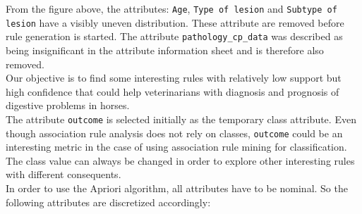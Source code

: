 From the figure above, the attributes: \verb|Age|, \verb|Type of lesion| and \verb|Subtype of lesion| have a visibly uneven distribution. These attribute are removed before rule generation is started. The attribute \verb|pathology_cp_data| was described as being insignificant in the attribute information sheet and is therefore also removed.\\
Our objective is to find some interesting rules with relatively low support but high confidence that could help veterinarians with diagnosis and prognosis of digestive problems in horses.\\
The attribute \verb|outcome| is selected initially as the temporary class attribute. Even though association rule analysis does not rely on classes,  \verb|outcome| could be an interesting metric in the case of using association rule mining for classification.\\
The class value can always be changed in order to explore other interesting rules with different consequents.\\
In order to use the Apriori algorithm, all attributes have to be nominal. So the following attributes are discretized accordingly:
